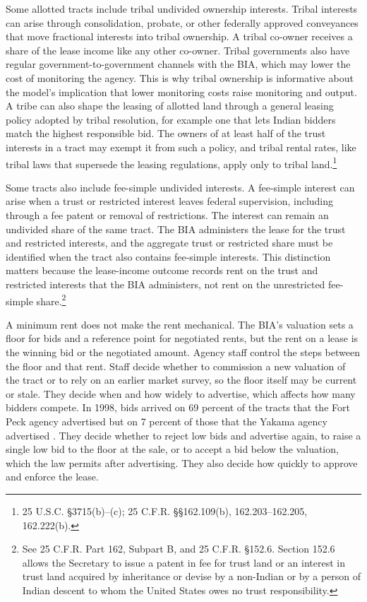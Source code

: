 \documentclass[12pt]{article}
\begin{document}
Some allotted tracts include tribal undivided ownership interests. Tribal interests can arise through consolidation, probate, or other federally approved conveyances that move fractional interests into tribal ownership. A tribal co-owner receives a share of the lease income like any other co-owner. Tribal governments also have regular government-to-government channels with the BIA, which may lower the cost of monitoring the agency. This is why tribal ownership is informative about the model's implication that lower monitoring costs raise monitoring and output. A tribe can also shape the leasing of allotted land through a general leasing policy adopted by tribal resolution, for example one that lets Indian bidders match the highest responsible bid. The owners of at least half of the trust interests in a tract may exempt it from such a policy, and tribal rental rates, like tribal laws that supersede the leasing regulations, apply only to tribal land.\footnote{25 U.S.C. \S 3715(b)--(c); 25 C.F.R. \S\S 162.109(b), 162.203--162.205, 162.222(b).}

Some tracts also include fee-simple undivided interests. A fee-simple interest can arise when a trust or restricted interest leaves federal supervision, including through a fee patent or removal of restrictions. The interest can remain an undivided share of the same tract. The BIA administers the lease for the trust and restricted interests, and the aggregate trust or restricted share must be identified when the tract also contains fee-simple interests. This distinction matters because the lease-income outcome records rent on the trust and restricted interests that the BIA administers, not rent on the unrestricted fee-simple share.\footnote{See 25 C.F.R. Part 162, Subpart B, and 25 C.F.R. \S 152.6. Section 152.6 allows the Secretary to issue a patent in fee for trust land or an interest in trust land acquired by inheritance or devise by a non-Indian or by a person of Indian descent to whom the United States owes no trust responsibility.}

A minimum rent does not make the rent mechanical. The BIA's valuation sets a floor for bids and a reference point for negotiated rents, but the rent on a lease is the winning bid or the negotiated amount. Agency staff control the steps between the floor and that rent. Staff decide whether to commission a new valuation of the tract or to rely on an earlier market survey, so the floor itself may be current or stale. They decide when and how widely to advertise, which affects how many bidders compete. In 1998, bids arrived on 69 percent of the tracts that the Fort Peck agency advertised but on 7 percent of those that the Yakama agency advertised \citep[p.~29]{GAO1999}. They decide whether to reject low bids and advertise again, to raise a single low bid to the floor at the sale, or to accept a bid below the valuation, which the law permits after advertising. They also decide how quickly to approve and enforce the lease.
\end{document}
